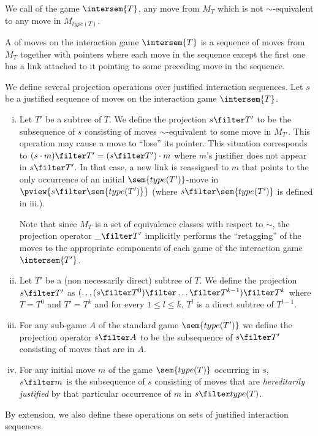 We call  of the game $\intersem{T}$, any move from $M_T$ which is not $\sim$-equivalent to any move in $M_{type(T)}$.
\smallskip

A  of moves on the interaction game $\intersem{T}$ is a sequence of moves from $M_T$ together with pointers where each move in the sequence except the first one has a link attached to it pointing to some preceding move in the sequence.


\begin{definition}[Projection] 
\label{def:sub_interstrat_projection}
We define several projection operations
over justified interaction sequences. Let $s$ be a justified
sequence of moves on the interaction game $\intersem{T}$.
\begin{enumerate}[i.]
\item  Let $T'$ be a subtree of $T$. We define the projection $s\filter T'$ to be the subsequence of $s$ consisting of moves $\sim$-equivalent to some move in $M_{T'}$. This operation may cause a move to ``lose'' its pointer. This situation corresponds to
    $(s \cdot m) \filter T' = (s \filter T') \cdot m$ where $m$'s justifier does not appear in $s \filter T'$.
    In that case, a new link is reassigned to $m$ that points to the only occurrence of an initial 
    $\sem{type(T')}$-move in $\pview{s \filter \sem{type(T')}}$ (where $s \filter \sem{type(T')}$ is defined in iii.).
    
    Note that since $M_T$ is a set of equivalence classes with respect to $\sim$, the projection operator $\_ \filter T'$ implicitly performs the ``retagging'' of the moves to the appropriate components of each game of the interaction game $\intersem{T'}$.

\item  Let $T'$ be a (non necessarily direct) subtree of $T$. 
    We define the projection $s\filter T'$ as  $(\ldots (s\filter T^0) \filter \ldots \filter T^{k-1}) \filter T^k$ 
    where $T=T^0$ and $T'=T^k$ and for every $1\leq l \leq k$, $T^l$ is a direct subtree of $T^{l-1}$.

\item For any sub-game $A$ of the standard game $\sem{type(T')}$ we define the projection operator $s\filter A$ to be the subsequence of $s\filter T'$ consisting of moves that are in $A$.

\item For any initial move $m$ of the game $\sem{type(T)}$ occurring in $s$, $s \filter m$ is the subsequence of $s$ consisting of moves that are \emph{hereditarily justified} by that particular occurrence of $m$ in $s \filter type(T)$.
\end{enumerate}
By extension, we also define these operations on sets of justified interaction sequences.
\end{definition}



